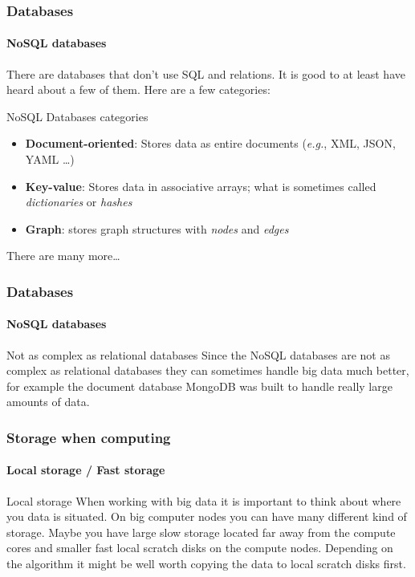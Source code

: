 \documentclass[aspectratio=169,dvipsnames]{beamer}
\begin{document}
    \begin{frame}
        \frametitle{Databases}
        \framesubtitle{NoSQL databases}

        There are databases that don't use SQL and relations. It is good to at
        least have heard about a few of them. Here are a few categories:

        \begin{block}{NoSQL Databases categories}
        \small
        \begin{itemize}
        \item \textbf{Document-oriented}: Stores data as entire documents (\textit{e.g.}, XML, JSON, YAML \ldots)
        \item \textbf{Key-value}: Stores data in associative arrays; what is sometimes
                         called \textit{dictionaries} or \textit{hashes}
        \item \textbf{Graph}: stores graph structures with \textit{nodes} and \textit{edges}
        \end{itemize}
        \end{block}
        There are many more\ldots
    \end{frame}
    
    \begin{frame}
        \frametitle{Databases}
        \framesubtitle{NoSQL databases}
        \begin{block}{Not as complex as relational databases}
            Since the \alert{NoSQL databases} are not as complex as relational
            databases they \alert{can sometimes handle big data much better}, for
            example the document database MongoDB was built to handle really
            large amounts of data.
        \end{block}
    \end{frame}

    \begin{frame}
        \frametitle{Storage when computing}
        \framesubtitle{Local storage / Fast storage}
        \begin{block}{Local storage}
        When working with big data it is important to think about where you
        data is situated. On big computer nodes you can have many different
        kind of storage. Maybe you have large slow storage located far away
        from the compute cores and smaller fast local scratch disks on the
        compute nodes. Depending on the algorithm it \alert{might be well worth
        copying the data to local scratch disks} first.
        \end{block}
    \end{frame}
\end{document}
